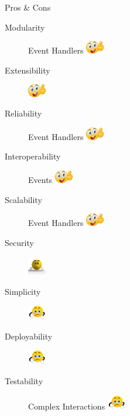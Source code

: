 \documentclass{slide}
\begin{document}
\begin{frame}{Pros \& Cons}
    \vspace{1mm}
    {\LARGE
    \begin{description}
        \item[Modularity] Event Handlers \tabto{15em}\includegraphics[width=8mm]{../../shared/images/thumbs-up.png}
        \item[Extensibility] \tabto{15em}\includegraphics[width=8mm]{../../shared/images/thumbs-up.png}
        \item[Reliability] Event Handlers \tabto{15em}\includegraphics[width=8mm]{../../shared/images/thumbs-up.png}
        \item[Interoperability] Events \tabto{15em}\includegraphics[width=8mm]{../../shared/images/thumbs-up.png}
        \item[Scalability] Event Handlers \tabto{15em}\includegraphics[width=8mm]{../../shared/images/thumbs-up.png}
        \item[Security] \tabto{15em}\includegraphics[trim=57 145 70 85,clip,width=8mm]{../../shared/images/neutral.png}
        \item[Simplicity] \tabto{15em}\includegraphics[trim=22 19 22 12,clip,width=8mm]{../../shared/images/thumbs-down.png}
        \item[Deployability] \tabto{15em}\includegraphics[trim=22 19 22 12,clip,width=8mm]{../../shared/images/thumbs-down.png}
        \item[Testability] Complex Interactions \tabto{15em}\includegraphics[trim=22 19 22 12,clip,width=8mm]{../../shared/images/thumbs-down.png}
    \end{description}
    }
\end{frame}
\end{document}
